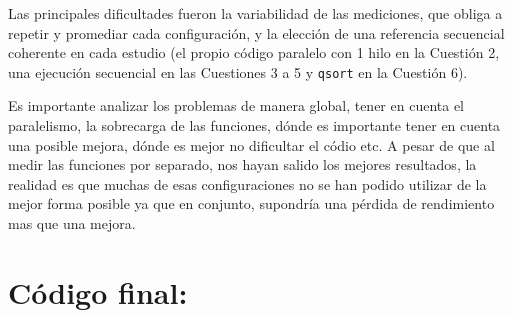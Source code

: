 \documentclass[12pt]{article}
\begin{document}
\begin{enumerate}
Las principales dificultades fueron la variabilidad de las mediciones, que obliga 
a repetir y promediar cada configuración, y la elección de una referencia secuencial 
coherente en cada estudio (el propio código paralelo con 1 hilo en la Cuestión 2, una
 ejecución secuencial en las Cuestiones 3 a 5 y \texttt{qsort} en la Cuestión 6). 

Es importante analizar los problemas de manera global, tener en cuenta el paralelismo, la sobrecarga de las funciones, dónde es importante 
tener en cuenta una posible mejora, dónde es mejor no dificultar el códio etc. A pesar de que al medir las funciones por separado, nos hayan salido los mejores resultados,
la realidad es que muchas de esas configuraciones no se han podido utilizar de la mejor forma posible ya que en conjunto, supondría una pérdida de rendimiento mas que 
una mejora.


\end{enumerate}



\newpage

\section{Código final: }
\end{document}
